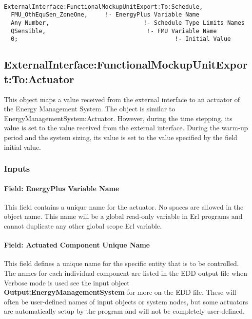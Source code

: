 \begin{lstlisting}

ExternalInterface:FunctionalMockupUnitExport:To:Schedule,
  FMU_OthEquSen_ZoneOne,     !- EnergyPlus Variable Name
  Any Number,                           !- Schedule Type Limits Names
  QSensible,                             !- FMU Variable Name
  0;                                             !- Initial Value
\end{lstlisting}

\subsection{ExternalInterface:FunctionalMockupUnitExport:To:Actuator}\label{externalinterfacefunctionalmockupunitexporttoactuator}

This object maps a value received from the external interface to an actuator of the Energy Management System. The object is similar to EnergyManagementSystem:Actuator. However, during the time stepping, its value is set to the value received from the external interface. During the warm-up period and the system sizing, its value is set to the value specified by the field initial value.

\subsubsection{Inputs}\label{inputs-11-004}

\paragraph{Field: EnergyPlus Variable Name}\label{field-energyplus-variable-name-6}

This field contains a unique name for the actuator. No spaces are allowed in the object name. This name will be a global read-only variable in Erl programs and cannot duplicate any other global scope Erl variable.

\paragraph{Field: Actuated Component Unique Name}\label{field-actuated-component-unique-name-2}

This field defines a unique name for the specific entity that is to be controlled. The names for each individual component are listed in the EDD output file when Verbose mode is used see the input object \textbf{Output:EnergyManagementSystem} for more on the EDD file. These will often be user-defined names of input objects or system nodes, but some actuators are automatically setup by the program and will not be completely user-defined.

